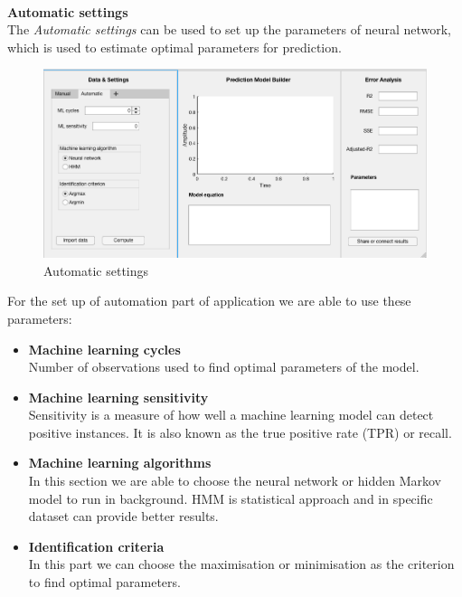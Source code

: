         \noindent
        \\
        \textbf{Automatic settings}\\
        The \emph{Automatic settings} can be used to set up the parameters of neural network,
        which is used to estimate optimal parameters for prediction. 
       \begin{figure}[h!]
        \centering
            \includegraphics[width=\textwidth]{figures/auto.png}
            \caption{Automatic settings}
            \label{fig:automatic}
    \end{figure}
                For the set up of automation part of application we are able to use these parameters:\\
        \begin{itemize}
            \item \textbf{Machine learning cycles}\\
            Number of observations used to find optimal parameters of the model.
            \item \textbf{Machine learning sensitivity}\\
            Sensitivity is a measure of how well a machine learning model can
            detect positive instances. It is also known as the true positive rate
            (TPR) or recall.
            \item \textbf{Machine learning algorithms}\\
            In this section we are able to choose the neural network or hidden Markov model
            to run in background. HMM is statistical approach and in specific dataset can provide
            better results.
            \item \textbf{Identification criteria}\\
            In this part we can choose the maximisation or minimisation as the criterion
            to find optimal parameters.
        \end{itemize}
   

